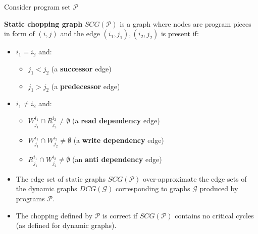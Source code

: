 \documentclass{beamer}
\begin{document}
\begin{frame}
	Consider program set $\mathcal{P}$
	\begin{definition}
		
		\textbf{Static chopping graph} $SCG(\mathcal{P})$ is a graph where nodes are program pieces in form of $(i, j)$ and the edge $(i_1, j_1), (i_2, j_2)$ is present if:
		\begin{itemize}
			\item $i_1 = i_2$ and:
			\begin{itemize}
				\item $j_1 < j_2$ (a \textbf{successor} edge)
				\item $j_1 > j_2$ (a \textbf{predecessor} edge)
			\end{itemize}
			\item $i_1 \ne i_2$ and:
			\begin{itemize}
				\item $W^{i_1}_{j_1}\cap R^{i_2}_{j_2} \ne \emptyset$ (a \textbf{read dependency} edge)
				\item $W^{i_1}_{j_1}\cap W^{i_2}_{j_2} \ne \emptyset$ (a \textbf{write dependency} edge)
				\item $R^{i_1}_{j_1}\cap W^{i_2}_{j_2} \ne \emptyset$ (an \textbf{anti dependency} edge)
			\end{itemize}
		\end{itemize}
	\end{definition}
\end{frame}

\begin{frame}
	\begin{itemize}
		\item The edge set of static graphs $SCG(\mathcal{P})$ over-approximate the edge sets of the dynamic graphs $DCG(\mathcal{G})$ corresponding to graphs $\mathcal{G}$ produced by programs $\mathcal{P}$.
		\item The chopping defined by $\mathcal{P}$ is correct if $SCG(\mathcal{P})$ contains no critical cycles (as defined for dynamic graphs).
	\end{itemize}
\end{frame}
\end{document}
